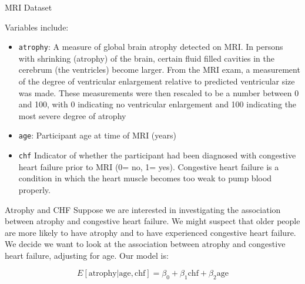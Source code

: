 \documentclass[10pt,t]{beamer}
\begin{document}
\begin{frame}{MRI Dataset}

Variables include:
\medskip	

\begin{itemize}
	\item \texttt{atrophy}: A measure of global brain atrophy detected on MRI. In persons with shrinking (atrophy) of the brain, certain fluid filled cavities in the cerebrum (the ventricles) become larger. From the MRI exam, a measurement of the degree of ventricular enlargement relative to predicted ventricular size was made. These measurements were then rescaled to be a number between 0 and 100, with 0 indicating no ventricular enlargement and 100 indicating the most severe degree of atrophy
	\medskip
	
	\item \texttt{age}: Participant age at time of MRI (years)
	\medskip
	
	\item \texttt{chf} Indicator of whether the participant had been diagnosed with congestive heart failure prior to MRI (0= no, 1= yes). Congestive heart failure is a condition in which the heart muscle becomes too weak to pump blood properly.
\end{itemize}
\end{frame}


\begin{frame}{Atrophy and CHF}
	Suppose we are interested in investigating the association between atrophy and congestive heart failure. We might suspect that older people are more likely to have atrophy and to have experienced congestive heart failure. We decide we want to look at the association between atrophy and congestive heart failure, adjusting for age. Our model is:
	
	
	\medskip
	
	\color{blue}\[E[\text{atrophy}|\text{age},\text{chf}]=\beta_0+\beta_1\text{chf}+\beta_2\text{age}\]
\end{frame}
\end{document}
